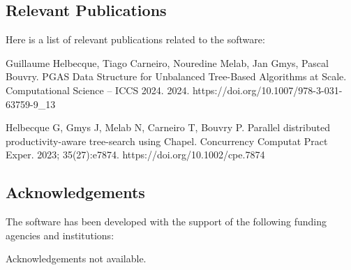 \subsection{Relevant Publications}
\label{sec:pBB:publications}

Here is a list of relevant publications related to the software:

Guillaume Helbecque, Tiago Carneiro, Nouredine Melab, Jan Gmys, Pascal Bouvry. PGAS Data Structure for Unbalanced Tree-Based Algorithms at Scale. Computational Science – ICCS 2024. 2024. https://doi.org/10.1007/978-3-031-63759-9\_13

Helbecque G, Gmys J, Melab N, Carneiro T, Bouvry P. Parallel distributed productivity-aware tree-search using Chapel. Concurrency Computat Pract Exper. 2023; 35(27):e7874. https://doi.org/10.1002/cpe.7874

\subsection{Acknowledgements}
\label{sec::pBB:acknowledgements}

The software has been developed with the support of the following funding agencies and institutions: 

Acknowledgements not available.


